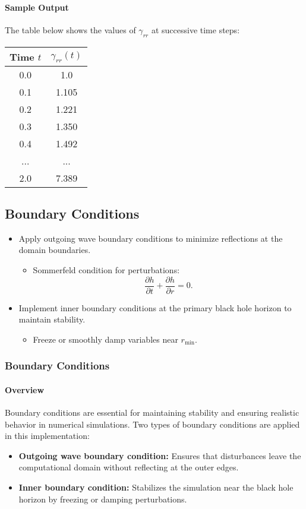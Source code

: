 \documentclass[12pt]{article}
\begin{document}
\paragraph{Sample Output}
The table below shows the values of $\gamma_{rr}$ at successive time steps:

\begin{center}
\begin{tabular}{|c|c|}
\hline
Time $t$ & $\gamma_{rr}(t)$ \\
\hline
0.0 & 1.0 \\
0.1 & 1.105 \\
0.2 & 1.221 \\
0.3 & 1.350 \\
0.4 & 1.492 \\
... & ... \\
2.0 & 7.389 \\
\hline
\end{tabular}
\end{center}

\subsection{Boundary Conditions}
\begin{itemize}
    \item Apply outgoing wave boundary conditions to minimize reflections at the domain boundaries.
    \begin{itemize}
        \item Sommerfeld condition for perturbations:
        \[
        \frac{\partial h}{\partial t} + \frac{\partial h}{\partial r} = 0.
        \]
    \end{itemize}
    \item Implement inner boundary conditions at the primary black hole horizon to maintain stability.
    \begin{itemize}
        \item Freeze or smoothly damp variables near $r_{\text{min}}$.
    \end{itemize}
\end{itemize}

\subsubsection{Boundary Conditions}

\paragraph{Overview}
Boundary conditions are essential for maintaining stability and ensuring realistic behavior in numerical simulations. Two types of boundary conditions are applied in this implementation:
\begin{itemize}
    \item \textbf{Outgoing wave boundary condition:} Ensures that disturbances leave the computational domain without reflecting at the outer edges.
    \item \textbf{Inner boundary condition:} Stabilizes the simulation near the black hole horizon by freezing or damping perturbations.
\end{itemize}
\end{document}
